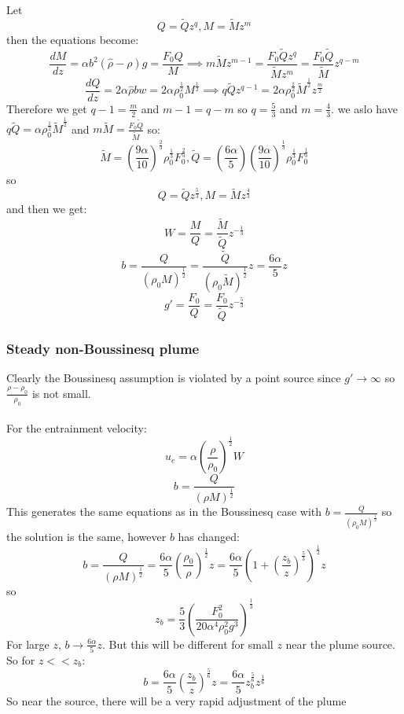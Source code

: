 \documentclass{article}
\begin{document}
Let
$$
 Q= \tilde Q z^q, M = \tilde M z^m
$$
then the equations become:
$$
\frac{dM}{dz} = \alpha b^2 ( \hat \rho - \rho ) g = \frac{F_0 Q}{M} \implies m \tilde M z^{m-1} = \frac{F_0 \tilde Q z^q}{\tilde M z^m} = \frac{F_0 \tilde Q}{\tilde M} z^{q-m}
$$
$$
 \frac{d Q}{dz} = 2 \alpha \hat \rho b w = 2 \alpha \rho_0^{\frac{1}{2}} M^{\frac{1}{2}} \implies q \tilde Q z^{q-1} = 2 \alpha \rho_0^{\frac{1}{2}} \tilde M^{\frac{1}{2}} z^{\frac{m}{2}}
$$
Therefore we get $q -1 = \frac{m}{2}$ and $ m-1 = q- m$ so $q = \frac{5}{3}$ and $m = \frac{4}{3}$. we aslo have $q \tilde Q = \alpha \rho_0^{\frac{1}{2}} \tilde M^{\frac{1}{2}}$ and $m \tilde M = \frac{F_0 \tilde Q}{\tilde M}$ so:
$$
 \tilde M = ( \frac{9 \alpha}{10})^{\frac{2}{3}} \rho_0^{\frac{1}{3}} F_0^{\frac{2}{3}}, \tilde Q = ( \frac{6 \alpha}{5}) ( \frac{9 \alpha}{10})^{\frac{1}{3}} \rho_0^{\frac{1}{3}} F_0^{\frac{1}{3}}
$$
so 
$$
 Q = \tilde Q z^{\frac{5}{3}}, M = \tilde M z^{\frac{4}{3}}
$$
 and then we get:
 $$
 W = \frac{M}{Q} = \frac{\tilde M}{\tilde Q} z^{- \frac{1}{3}}
 $$
 $$
  b = \frac{Q}{( \rho_0 M)^{\frac{1}{2}}} = \frac{\tilde Q}{( \rho_0 \tilde M)^{\frac{1}{2}}} z = \frac{6 \alpha}{ 5} z
 $$
  $$
   g' = \frac{F_0}{Q} = \frac{F_0}{\tilde Q} z^{- \frac{5}{3}}
  $$
\subsubsection{Steady non-Boussinesq plume}
                 Clearly the Boussinesq assumption is violated by a point source since $g' \rightarrow \infty$ so $\frac{ \rho - \rho_0}{\rho_0}$ is not small.\\\\
                 For the entrainment velocity:
                 $$
                  u_e = \alpha ( \frac{\rho}{\rho_0})^{\frac{1}{2}} W
                 $$
                 $$
                  b = \frac{Q}{(\rho M)^{\frac{1}{2}}}
                 $$
                 This generates the same equations as in the Boussinesq case with $b = \frac{Q}{(\rho_0 M)^{\frac{1}{2}}}$ so the solution is the same, however $b$ has changed:
                 $$
                 b= \frac{Q}{(\rho M)^{\frac{1}{2}} }= \frac{6 \alpha}{5} ( \frac{\rho_0}{\rho})^{\frac{1}{2}} z = \frac{6 \alpha}{5} ( 1 + ( \frac{z_b}{z})^{\frac{5}{3}} )^{\frac{1}{2}} z
                 $$
                 so
                 $$
                 z_b = \frac{5}{3} ( \frac{F_0^2}{20 \alpha^4 \rho_0^2 g^3})^{\frac{1}{3}}
                 $$
                 For large $z$, $b \rightarrow \frac{6\alpha}{5} z$. But this will be different for small $z$ near the plume source. So for $z << z_b$:
                 $$
                 b = \frac{6 \alpha}{5} ( \frac{z_b}{z})^{\frac{5}{6}} z =  \frac{6 \alpha}{5} z_b^{\frac{5}{6}} z^{\frac{1}{6}}
                 $$
                 So near the source, there will be a very rapid adjustment of the plume
\end{document}
